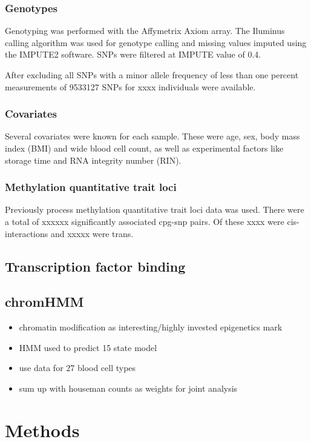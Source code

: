 \documentclass[a4paper,12pt]{article}
\begin{document}
\subsubsection{Genotypes}
Genotyping was performed with the Affymetrix Axiom array. The Iluminus calling algorithm was used for genotype calling and missing values imputed using the IMPUTE2 software. SNPs were filtered at IMPUTE value of 0.4. 

After excluding all SNPs with a minor allele frequency of less than one percent measurements of 9533127 SNPs for xxxx individuals were available. 

\subsubsection{Covariates}
Several covariates were known for each sample. These were age, sex, body mass index (BMI) and wide blood cell count, as well as experimental factors like storage time and RNA integrity number (RIN).

\subsubsection{Methylation quantitative trait loci}
Previously process methylation quantitative trait loci data was used. There were a total of xxxxxx significantly associated cpg-snp pairs. Of these xxxx were cis-interactions and xxxxx were trans.


\subsection{Transcription factor binding}

\subsection{chromHMM}
\begin{itemize}
\item chromatin modification as interesting/highly invested epigenetics mark
\item HMM used to predict 15 state model
\item use data for 27 blood cell types
\item sum up with houseman counts as weights for joint analysis
\end{itemize}

\section{Methods}
\end{document}
